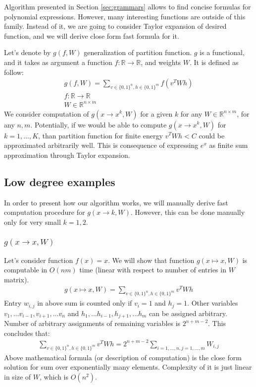 Algorithm presented in Section
\ref{sec:grammars} allows to find concise formulas for polynomial expressions.
However, many interesting functions are outside of this family.  Instead of it,
we are going to consider Taylor expansion of desired function, and we will
derive close form fast formula for it.

Let's denote by $g(f, W)$ generalization of partition function. 
$g$ is a functional, and it takes as argument a function $f : \mathbb{R} \rightarrow \mathbb{R}$,
and weights $W$. It is defined as follow: 
\begin{gather*}
g(f, W) = \sum_{v \in \{0, 1\}^n, h \in \{0, 1\}^m} f(v^TWh) \\
f : \mathbb{R} \rightarrow \mathbb{R}\\
W \in \mathbb{R}^{n \times m}
\end{gather*}
We consider computation of $g(x \rightarrow x^k, W)$ for a given $k$ for any $W
\in \mathbb{R}^{n \times m}$, for any $n, m$. Potentially, if we would be able
to compute $g(x \rightarrow x^k, W)$ for $k = 1, \dots, K$, than partition
function for finite energy $v^TWh < C$ could be approximated arbitrarily well.
This is consequence of expressing $e^{x}$ as finite sum approximation through
Taylor expansion.

\subsection{Low degree examples} In order to present how our algorithm works,
we will manually derive fast computation procedure for $g(x \rightarrow k, W)$.
However, this can be done manually only for very small $k = 1, 2$. 


\subsubsection{$g(x \rightarrow x, W)$} Let's consider function $f(x) = x$. We
will show that function $g(x \mapsto x, W)$ is computable in $O(nm)$ time
(linear with respect to number of entries in $W$ matrix).
\begin{gather*}
	g(x \mapsto x, W) = \sum_{v \in \{0, 1\}^n, h \in \{0, 1\}^m} v^TWh
\end{gather*}
Entry $w_{i,j}$ in above sum is counted only if $v_i = 1$ and $h_j = 1$. Other variables
$v_1, \dots v_{i-1}, v_{i+1}, \dots v_n$ and $h_1, \dots h_{i-1}, h_{j+1}, \dots h_m$ can be 
assigned arbitrary. Number of arbitrary assignments of remaining variables is $2^{n + m - 2}$. 
This concludes that:
\begin{gather*}
	\sum_{v \in \{0, 1\}^n, h \in \{0, 1\}^m} v^TWh = 2^{n + m - 2}\sum_{i = 1, \dots, n, j = 1, \dots, m} W_{i, j}
\end{gather*}
Above mathematical formula (or description of computation) is the close form solution for sum over exponentially many elements.
Complexity of it is just linear in size of $W$, which is $O(n^2)$.

